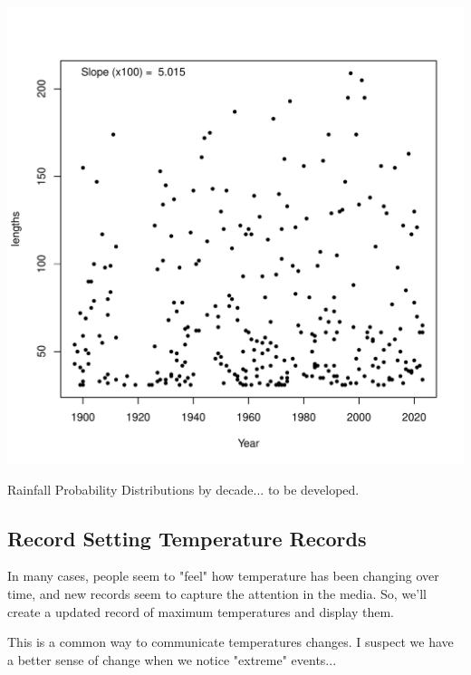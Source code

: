 \documentclass{article}
\begin{document}
\begin{itemize}
\begin{knitrout}
\begin{kframe}
{\ttfamily\noindent\bfseries\color{errorcolor}{\#\# Error in h(simpleError(msg, call)): error in evaluating the argument 'object' in selecting a method for function 'summary': object 'Drought.run.100' not found}}\end{kframe}
\includegraphics[width=\maxwidth]{figure/unnamed-chunk-9-2} 
\end{knitrout}

Rainfall Probability Distributions by decade... to be developed.





\subsection{Record Setting Temperature Records}

In many cases, people seem to "feel" how temperature has been changing over time, and new records seem to capture the attention in the media. So, we'll create a updated record of maximum temperatures and display them. 





This is a common way to communicate temperatures changes. I suspect we have a better sense of change when we notice "extreme" events...







\end{itemize}
\end{document}
